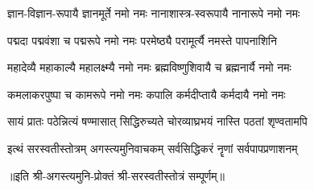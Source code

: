 \twolineshloka
{ज्ञान-विज्ञान-रूपायै ज्ञानमूर्ते नमो नमः}
{नानाशास्त्र-स्वरूपायै नानारूपे नमो नमः}

\twolineshloka
{पद्मदा पद्मवंशा च पद्मरूपे नमो नमः}
{परमेष्ठ्यै परामूर्त्यै नमस्ते पापनाशिनि}

\twolineshloka
{महादेव्यै महाकाल्यै महालक्ष्म्यै नमो नमः}
{ब्रह्मविष्णुशिवायै च ब्रह्मनार्यै नमो नमः}

\twolineshloka
{कमलाकरपुष्पा च कामरूपे नमो नमः}
{कपालि कर्मदीप्तायै कर्मदायै नमो नमः}

\twolineshloka
{सायं प्रातः पठेन्नित्यं षण्मासात् सिद्धिरुच्यते}
{चोरव्याघ्रभयं नास्ति पठतां शृण्वतामपि}

\twolineshloka
{इत्थं सरस्वतीस्तोत्रम् अगस्त्यमुनिवाचकम्}
{सर्वसिद्धिकरं नॄणां सर्वपापप्रणाशनम्}

॥इति श्री-अगस्त्यमुनि-प्रोक्तं श्री-सरस्वतीस्तोत्रं सम्पूर्णम्॥